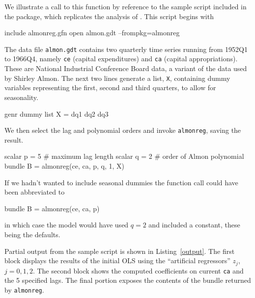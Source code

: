 \documentclass{article}
\begin{document}
We illustrate a call to this function by reference to the sample
script included in the package, which replicates the analysis of
\cite{almon65}. This script begins with
%
\begin{code}
include almonreg.gfn
open almon.gdt --frompkg=almonreg
\end{code}
%
The data file \texttt{almon.gdt} contains two quarterly time series
running from 1952Q1 to 1966Q4, namely \texttt{ce} (capital
expenditures) and \texttt{ca} (capital appropriations). These are
National Industrial Conference Board data, a variant of the data used
by Shirley Almon. The next two lines generate a list, \texttt{X},
containing dummy variables representing the first, second and third
quarters, to allow for seasonality.
%
\begin{code}
genr dummy
list X = dq1 dq2 dq3
\end{code}
%
We then select the lag and polynomial orders and invoke
\texttt{almonreg}, saving the result.
%
\begin{code}
scalar p = 5 # maximum lag length
scalar q = 2 # order of Almon polynomial
bundle B = almonreg(ce, ca, p, q, 1, X)
\end{code}
%
If we hadn't wanted to include seasonal dummies the function call
could have been abbreviated to
\begin{code}
bundle B = almonreg(ce, ca, p)
\end{code}
%
in which case the model would have used $q = 2$ and included a
constant, these being the defaults.

Partial output from the sample script is shown in
Listing~\ref{output}. The first block displays the results of the
initial OLS using the ``artificial regressors'' $z_j$, $j=0,1,2$.  The
second block shows the computed coefficients on current \texttt{ca}
and the 5 specified lags. The final portion exposes the contents of
the bundle returned by \texttt{almonreg}.
\end{document}
